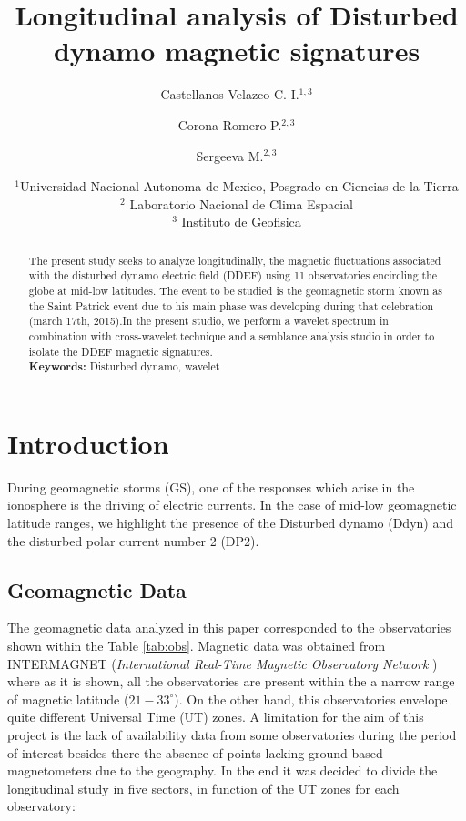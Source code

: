 \documentclass[a4paper]{article}
\title{Longitudinal analysis of Disturbed dynamo magnetic signatures}
\author{Castellanos-Velazco C. I.$^{1,3}$ \and Corona-Romero P.$^{2,3}$ \and Sergeeva M.$^{2,3}$}
\date{
	$^1$Universidad Nacional Autonoma de Mexico, Posgrado en Ciencias de la Tierra \\ %
	$^2$ Laboratorio Nacional de Clima Espacial \\
	$^3$ Instituto de Geofisica
}
\theoremstyle{plain}
\theoremstyle{definition}
\begin{document}
	\maketitle
	
	\begin{abstract}
		
		The present study seeks to analyze longitudinally, the magnetic fluctuations associated with the disturbed dynamo electric field (DDEF) using 11 observatories encircling the globe at mid-low latitudes. The event to be studied is the geomagnetic storm known as the Saint Patrick event due to his main phase was developing during that celebration (march 17th, 2015).In the present studio, we perform a wavelet spectrum in combination with cross-wavelet technique and a semblance analysis studio in order to isolate the DDEF magnetic signatures.  
		\\
		
		\noindent\textbf{Keywords:} Disturbed dynamo, wavelet
	\end{abstract}

	
	\section{Introduction}
	\label{sec:intro}
		
	During geomagnetic storms (GS), one of the responses which arise in the ionosphere is the driving of electric currents. In the case of mid-low geomagnetic latitude ranges, we highlight the presence of the Disturbed dynamo (Ddyn) and the disturbed polar current number 2 (DP2). \\
	
	\subsection{Geomagnetic Data}
	The geomagnetic data analyzed in this paper corresponded to the observatories shown within the Table \ref{tab:obs}. Magnetic data was obtained from INTERMAGNET (\textit{International Real-Time Magnetic Observatory Network} \citep{intermagnet})  where as it is shown, all the observatories are present within the a narrow range of magnetic latitude ($21 - 33^\circ$). On the other hand, this observatories envelope quite different Universal Time (UT) zones. A limitation for the aim of this project is the lack of availability data from some observatories during the period of interest besides there the absence of points lacking ground based magnetometers due to the geography. In the end it was decided to divide the longitudinal study in five sectors, in function of the UT zones for each observatory:
	
\end{document}
